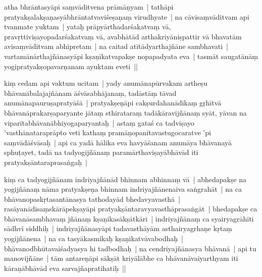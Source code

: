 \documentclass[article,12pt,a4paper]{memoir}%
\newcounter{parCount}
\begin{document}
	  \pstart \leavevmode%
	\label{thakur75-16.7}atha bhrāntasyāpi saṃvāditvena prāmāṇyam | tathāpi pratyakṣalakṣaṇasyābhrāntatvaviśeṣaṇaṃ virudhyate | na cāvisaṃvāditvam api tvanmate yuktam | yataḥ prāpyārthadarśakatvaṃ vā, pravṛttiviṣayopadarśakatvaṃ vā, avabhātād arthakriyāniṣpattir vā bhavatām avisaṃvāditvam abhipretam | na caitad atītādyarthajñāne sambhavati | vartamānārthajñānasyāpi kṣaṇikatvapakṣe nopapadyata eva | tasmāt saugatānāṃ yogipratyakṣopavarṇanam ayuktam eveti || 
	{}
	\pend%
      

	  \pstart \leavevmode%
	\label{thakur75-16.12}kiṃ cedam api vaktum ucitam | yady anumānapūrvakam artheṣu bhāvanābalajajñānam āśvāsabhājanaṃ, tadāstāṃ tāvad anumānapauruṣapratyāśā | pratyakṣeṇāpi cakṣurdahanādikaṃ gṛhītvā bhāvanāprakarṣaparyante jātaṃ sthirataraṃ tadākāravijñānaṃ syāt, yāvan na viparītabhāvanābhiyogaparyantaḥ | astaṃ gataś ca tadviṣayo 'vasthānataraprāpto veti kathaṃ pramāṇopanītavastugocaratve 'pi saṃvādāśvāsaḥ | api ca yadā hālika eva havyāśanam anumāya bhāvanayā sphuṭayet, tadā na tadyogijñānaṃ paramārthaviṣayābhāvād iti pratyakṣāntaraprasaṅgaḥ | 
	{}
	\pend%
      

	  \pstart \leavevmode%
	\label{thakur75-16.19}kiṃ ca tadyogijñānam indriyajñānād bhinnam abhinnaṃ vā | abhedapakṣe na yogijñānaṃ nāma pratyakṣeṇa bhinnam indriyajñānenaiva saṅgrahāt | na ca bhāvanopaskṛtasantānasya tathodayād bhedavyavasthā | rasāyanādisaṃskārāpekṣayāpi pratyakṣāntaravyavasthāprasaṅgāt | bhedapakṣe ca bhāvanāsambhavaṃ jñānaṃ kṣaṇikasākṣātkāri | indriyajñānaṃ ca syairyagrāhīti sādhvī siddhiḥ | indriyajñānasyāpi tadavasthāyām asthairyagrhaṇe kṛtaṃ yogijñānena | na ca tasyākasmikaḥ kṣaṇikatvāvabodhaḥ | bhāvanodbhūtavaiśadyasya hi tadbodhaḥ | na cendriyajñānasya bhāvanā | api tu manovijñāne | tām antareṇāpi sākṣāt kriyālābhe ca bhāvanāvaiyarthyam iti kāraṇābhāvād eva sarvajñapratihatiḥ || 
	{}
	\pend%
      
\end{document}

